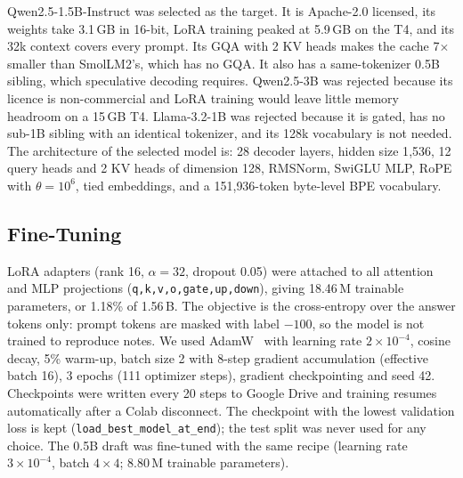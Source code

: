 \documentclass[conference]{IEEEtran}
\begin{document}
\begin{table}[t]
\caption{Open-weight decoder candidates (KV cache in 16-bit, per 1k tokens)}
\label{tab:models}
\centering
\footnotesize
\setlength{\tabcolsep}{2.2pt}
\end{table}

Qwen2.5-1.5B-Instruct was selected as the target. It is Apache-2.0 licensed, its weights take 3.1\,GB in 16-bit, LoRA training peaked at 5.9\,GB on the T4, and its 32k context covers every prompt. Its GQA with 2 KV heads makes the cache 7$\times$ smaller than SmolLM2's, which has no GQA. It also has a same-tokenizer 0.5B sibling, which speculative decoding requires. Qwen2.5-3B was rejected because its licence is non-commercial and LoRA training would leave little memory headroom on a 15\,GB T4. Llama-3.2-1B was rejected because it is gated, has no sub-1B sibling with an identical tokenizer, and its 128k vocabulary is not needed. The architecture of the selected model is: 28 decoder layers, hidden size 1{,}536, 12 query heads and 2 KV heads of dimension 128, RMSNorm, SwiGLU MLP, RoPE with $\theta=10^6$, tied embeddings, and a 151{,}936-token byte-level BPE vocabulary.

\subsection{Fine-Tuning}
LoRA adapters (rank 16, $\alpha=32$, dropout 0.05) were attached to all attention and MLP projections (\texttt{q,k,v,o,gate,up,down}), giving 18.46\,M trainable parameters, or 1.18\% of 1.56\,B. The objective is the cross-entropy over the answer tokens only: prompt tokens are masked with label $-100$, so the model is not trained to reproduce notes. We used AdamW~\cite{loshchilov2019adamw} with learning rate $2\times10^{-4}$, cosine decay, 5\% warm-up, batch size 2 with 8-step gradient accumulation (effective batch 16), 3 epochs (111 optimizer steps), gradient checkpointing and seed 42. Checkpoints were written every 20 steps to Google Drive and training resumes automatically after a Colab disconnect. The checkpoint with the lowest validation loss is kept (\texttt{load\_best\_model\_at\_end}); the test split was never used for any choice. The 0.5B draft was fine-tuned with the same recipe (learning rate $3\times10^{-4}$, batch $4\times4$; 8.80\,M trainable parameters).
\end{document}

